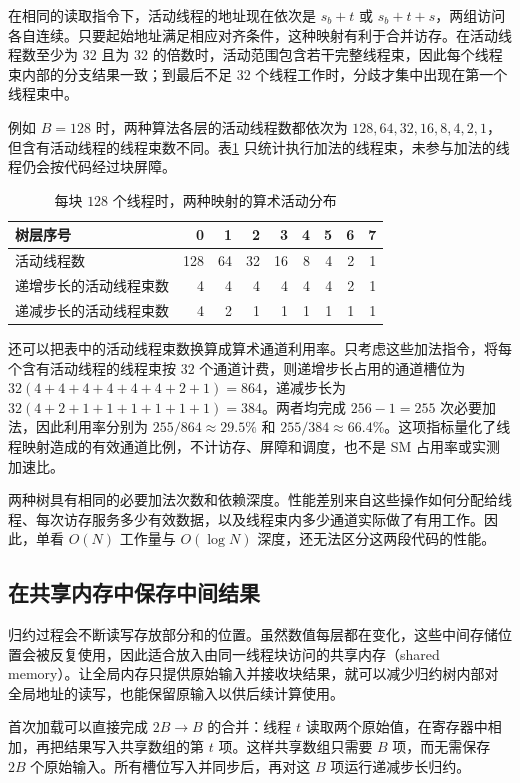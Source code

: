 在相同的读取指令下，活动线程的地址现在依次是 $s_b+t$ 或 $s_b+t+s$，两组访问各自连续。只要起始地址满足相应对齐条件，这种映射有利于合并访存。在活动线程数至少为 $32$ 且为 $32$ 的倍数时，活动范围包含若干完整线程束，因此每个线程束内部的分支结果一致；到最后不足 $32$ 个线程工作时，分歧才集中出现在第一个线程束中。

例如 $B=128$ 时，两种算法各层的活动线程数都依次为 $128,64,32,16,8,4,2,1$，但含有活动线程的线程束数不同。表\ref{l15:tab:warp-activity} 只统计执行加法的线程束，未参与加法的线程仍会按代码经过块屏障。

\begin{table}[htbp]
\centering
\caption{每块 $128$ 个线程时，两种映射的算术活动分布}
\label{l15:tab:warp-activity}
\begin{tabular}{@{}lrrrrrrrr@{}}
\toprule
树层序号 & 0 & 1 & 2 & 3 & 4 & 5 & 6 & 7\\
\midrule
活动线程数 &128&64&32&16&8&4&2&1\\
递增步长的活动线程束数 &4&4&4&4&4&4&2&1\\
递减步长的活动线程束数 &4&2&1&1&1&1&1&1\\
\bottomrule
\end{tabular}
\end{table}

还可以把表中的活动线程束数换算成算术通道利用率。只考虑这些加法指令，将每个含有活动线程的线程束按 $32$ 个通道计费，则递增步长占用的通道槽位为 $32(4+4+4+4+4+4+2+1)=864$，递减步长为 $32(4+2+1+1+1+1+1+1)=384$。两者均完成 $256-1=255$ 次必要加法，因此利用率分别为 $255/864\approx29.5\%$ 和 $255/384\approx66.4\%$。这项指标量化了线程映射造成的有效通道比例，不计访存、屏障和调度，也不是 SM 占用率或实测加速比。

两种树具有相同的必要加法次数和依赖深度。性能差别来自这些操作如何分配给线程、每次访存服务多少有效数据，以及线程束内多少通道实际做了有用工作。因此，单看 $O(N)$ 工作量与 $O(\log N)$ 深度，还无法区分这两段代码的性能。

\subsection{在共享内存中保存中间结果}

归约过程会不断读写存放部分和的位置。虽然数值每层都在变化，这些中间存储位置会被反复使用，因此适合放入由同一线程块访问的共享内存（shared memory）。让全局内存只提供原始输入并接收块结果，就可以减少归约树内部对全局地址的读写，也能保留原输入以供后续计算使用。

首次加载可以直接完成 $2B\to B$ 的合并：线程 $t$ 读取两个原始值，在寄存器中相加，再把结果写入共享数组的第 $t$ 项。这样共享数组只需要 $B$ 项，而无需保存 $2B$ 个原始输入。所有槽位写入并同步后，再对这 $B$ 项运行递减步长归约。

